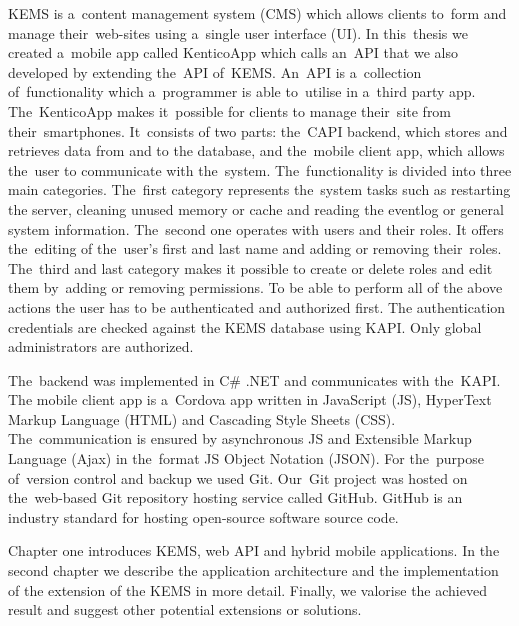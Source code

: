 \label{introduction}
KEMS is a~content management system (CMS) which allows clients to~form and manage their~web-sites using a~single user interface (UI). In this~thesis we created a~mobile app called KenticoApp which calls an~API that we also developed by extending the~API of~KEMS. An~API is a~collection of~functionality which a~programmer is able to~utilise in a~third party app. The~KenticoApp makes it~possible for clients to manage their~site from their~smartphones. It~consists of two parts: the~CAPI backend, which stores and retrieves data from and to \linebreak[4] the database, and the~mobile client app, which allows the~user to communicate with the~system.  The~functionality is divided into three main categories. The~first category represents the~system tasks such as restarting the server, cleaning unused memory or cache and reading the eventlog or general system information. The~second one operates with users and their roles. It offers the~editing of the~user's first and last name and adding or removing their~roles. The~third and last category makes it possible to create or delete roles and edit them by~adding or removing permissions. To be able to perform all of the above actions the user has to be authenticated and authorized first. The authentication credentials are checked against the KEMS database using KAPI. Only global administrators are authorized.

The~backend was implemented in C\# .NET and communicates with the~KAPI. The mobile client app is a~Cordova app written in JavaScript (JS), HyperText Markup Language (HTML) and Cascading Style Sheets (CSS). The~communication is ensured by asynchronous JS and Extensible Markup Language (Ajax) in the~format JS Object Notation (JSON). For the~purpose of~version control and backup we used Git. Our~Git project was hosted on the~web-based Git repository hosting service called GitHub. GitHub is an industry standard for hosting open-source software source code. 

Chapter one introduces KEMS, web API and hybrid mobile applications. In the second chapter we describe the application architecture and the implementation of the extension of the KEMS in more detail. Finally, we valorise the achieved result and suggest other potential extensions or solutions.
